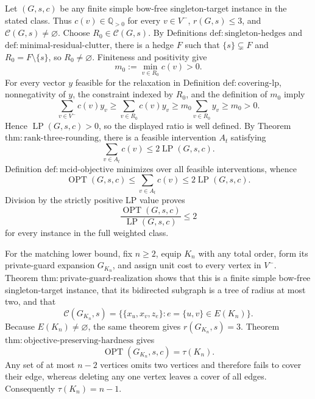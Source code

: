 Let \((G,s,c)\) be any finite simple bow-free singleton-target instance in the stated class.  Thus \(c(v)\in\mathbb Q_{>0}\) for every \(v\in V^{-}\), \(r(G,s)\leq 3\), and \(\mathcal C(G,s)\neq\varnothing\).  Choose \(R_0\in\mathcal C(G,s)\).  By Definitions \(\mathrm{def{:}singleton\mbox{-}hedges}\) and \(\mathrm{def{:}minimal\mbox{-}residual\mbox{-}clutter}\), there is a hedge \(F\) such that \(\{s\}\subsetneq F\) and \(R_0=F\setminus\{s\}\), so \(R_0\neq\varnothing\).  Finiteness and positivity give
\[
 m_0:=\min_{v\in R_0}c(v)>0.
\]
For every vector \(y\) feasible for the relaxation in Definition \(\mathrm{def{:}covering\mbox{-}lp}\), nonnegativity of \(y\), the constraint indexed by \(R_0\), and the definition of \(m_0\) imply
\[
 \sum_{v\in V^{-}}c(v)y_v
 \geq \sum_{v\in R_0}c(v)y_v
 \geq m_0\sum_{v\in R_0}y_v
 \geq m_0>0.
\]
Hence \(\operatorname{LP}(G,s,c)>0\), so the displayed ratio is well defined.  By Theorem \(\mathrm{thm{:}rank\mbox{-}three\mbox{-}rounding}\), there is a feasible intervention \(A_t\) satisfying
\[
 \sum_{v\in A_t}c(v)\leq 2\operatorname{LP}(G,s,c).
\]
Definition \(\mathrm{def{:}mcid\mbox{-}objective}\) minimizes over all feasible interventions, whence
\[
 \operatorname{OPT}(G,s,c)
 \leq \sum_{v\in A_t}c(v)
 \leq 2\operatorname{LP}(G,s,c).
\]
Division by the strictly positive LP value proves
\[
 \frac{\operatorname{OPT}(G,s,c)}{\operatorname{LP}(G,s,c)}\leq 2
\]
for every instance in the full weighted class.

For the matching lower bound, fix \(n\geq2\), equip \(K_n\) with any total order, form its private-guard expansion \(G_{K_n}\), and assign unit cost to every vertex in \(V^{-}\).  Theorem \(\mathrm{thm{:}private\mbox{-}guard\mbox{-}realization}\) shows that this is a finite simple bow-free singleton-target instance, that its bidirected subgraph is a tree of radius at most two, and that
\[
 \mathcal C(G_{K_n},s)
 =\bigl\{\{x_u,x_v,z_e\}:e=\{u,v\}\in E(K_n)\bigr\}.
\]
Because \(E(K_n)\neq\varnothing\), the same theorem gives \(r(G_{K_n},s)=3\).  Theorem \(\mathrm{thm{:}objective\mbox{-}preserving\mbox{-}hardness}\) gives
\[
 \operatorname{OPT}(G_{K_n},s,c)=\tau(K_n).
\]
Any set of at most \(n-2\) vertices omits two vertices and therefore fails to cover their edge, whereas deleting any one vertex leaves a cover of all edges.  Consequently \(\tau(K_n)=n-1\).

